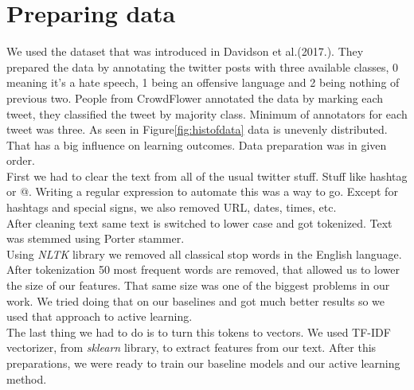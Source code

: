 \documentclass[10pt, a4paper]{article}
\begin{document}
\section{Preparing data}
We used the dataset that was introduced in Davidson et al.(2017.). They prepared the data by annotating the twitter posts with three available classes, 0 meaning it's a hate speech, 1 being an offensive language and 2 being nothing of previous two. People from CrowdFlower annotated the data by marking each tweet, they classified the tweet by majority class. Minimum of annotators for each tweet was three.
As seen in Figure\ref{fig:histofdata} data is unevenly distributed. That has a big influence on learning outcomes. Data preparation was in given order.
\\First we had to clear the text from all of the usual twitter stuff. Stuff like hashtag or @. Writing a regular expression to automate this was a way to go. Except for  hashtags and special signs, we also removed URL, dates, times, etc.
\\After cleaning text same text is switched to lower case and got tokenized. Text was stemmed using Porter stammer.
\\Using \textit{NLTK} library we removed all classical stop words in the English language. After tokenization 50 most frequent words are removed, that allowed us to lower the size of our features. That same size was one of the biggest problems in our work.
We tried doing that on our baselines and got much better results so we used that approach to active learning.
\\The last thing we had to do is to turn this tokens to vectors. We used TF-IDF vectorizer, from \textit{sklearn} library, to extract features from our text. After this preparations, we were ready to train our baseline models and our active learning method.
\begin{table}[t!]
	\centering
	\caption{First row shows the original tweet post from dataset, the second row shows cleaned, tokenized and steammed tweet post}
	\label{tbl:prepData}
\end{table}
\end{document}
